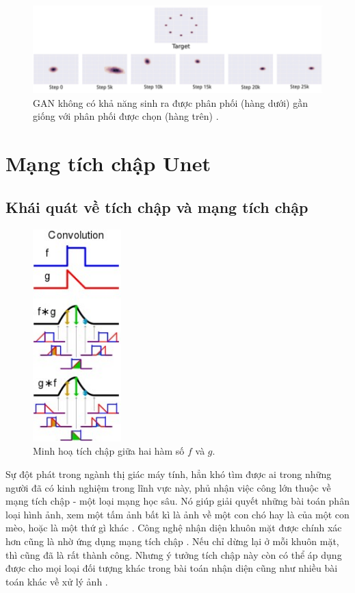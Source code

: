 \documentclass[a4paper, 12pt]{report}
\begin{document}
\begin{figure}[!h]
\captionsetup{width=0.8\textwidth}
\centering
\includegraphics[width=15cm]{images/divgan.PNG}
\caption{GAN không có khả năng sinh ra được phân phối (hàng dưới) gần giống với phân phối được chọn (hàng trên) \cite{metz2017unrolled}.}
\label{fig:divgan}
\end{figure}

\section{Mạng tích chập Unet}\label{unetarchitecture}

\subsection{Khái quát về tích chập và mạng tích chập}\label{convolutionnet}

\begin{figure}
\includegraphics[width=3.4cm]{images/convolution.jpg} 
\caption{Minh hoạ tích chập giữa hai hàm số $f$ và $g$.}
\label{fig:convof2functions}
\end{figure}

Sự đột phát trong ngành thị giác máy tính, hẳn khó tìm được ai trong những người đã có kinh nghiệm trong lĩnh vực này, phủ nhận việc công lớn thuộc về mạng tích chập - một loại mạng học sâu.
Nó giúp giải quyết những bài toán phân loại hình ảnh, xem một tấm ảnh bất kì là ảnh về một con chó hay là của một con mèo, hoặc là một thứ gì khác \cite{wikialexnet2021}.
Công nghệ nhận diện khuôn mặt được chính xác hơn cũng là nhờ ứng dụng mạng tích chập \cite{faceregusingcnn2019}.
Nếu chỉ dừng lại ở mỗi khuôn mặt, thì cũng đã là rất thành công.
Nhưng ý tưởng tích chập này còn có thể áp dụng được cho mọi loại đối tượng khác trong bài toán nhận diện \cite{objregusingcnn2019} cũng như nhiều bài toán khác về xử lý ảnh \cite{applofcnnpune2016}.\vspace{5pt}
\end{document}
